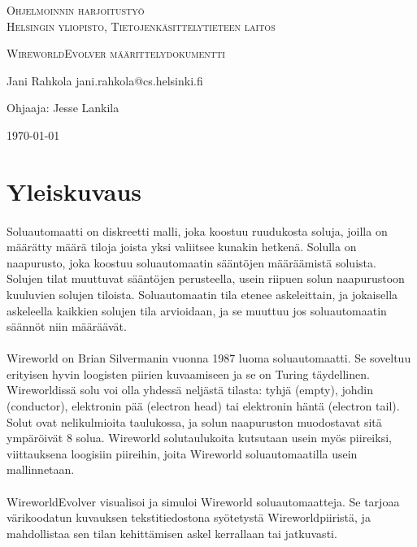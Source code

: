 \documentclass[a4paper,12pt]{article}
\begin{document}
\begin{titlepage}
\begin{center}
\textsc{\large Ohjelmoinnin harjoitustyö}\\[0.2cm] 
\textsc{\large Helsingin yliopisto, Tietojenkäsittelytieteen
laitos}\\[0.2cm]

\vspace{1cm}

\textsc{\LARGE WireworldEvolver määrittelydokumentti}

\vspace{2cm}

Jani Rahkola
jani.rahkola@cs.helsinki.fi

Ohjaaja: Jesse Lankila


\vfill
{\large \today}

\end{center}
\end{titlepage}

\section{Yleiskuvaus}
\paragraph{}
Soluautomaatti on diskreetti malli, joka koostuu ruudukosta soluja,
joilla on määrätty määrä tiloja joista yksi valiitsee kunakin hetkenä.
Solulla on naapurusto, joka koostuu soluautomaatin sääntöjen määräämistä
soluista. Solujen tilat muuttuvat sääntöjen perusteella, usein riipuen
solun naapurustoon kuuluvien solujen tiloista. Soluautomaatin tila
etenee askeleittain, ja jokaisella askeleella kaikkien solujen tila
arvioidaan, ja se muuttuu jos soluautomaatin säännöt niin määräävät.
\paragraph{}
Wireworld on Brian Silvermanin vuonna 1987 luoma soluautomaatti. Se
soveltuu erityisen hyvin loogisten piirien kuvaamiseen ja se on Turing
täydellinen. Wireworldissä solu voi olla yhdessä neljästä tilasta:
tyhjä (empty), johdin (conductor), elektronin pää (electron head) tai
elektronin häntä (electron tail). Solut ovat nelikulmioita taulukossa,
ja solun naapuruston muodostavat sitä ympäröivät 8 solua. Wireworld
solutaulukoita kutsutaan usein myös piireiksi, viittauksena loogisiin
piireihin, joita Wireworld soluautomaatilla usein mallinnetaan.
\paragraph{}
WireworldEvolver visualisoi ja simuloi Wireworld soluautomaatteja. Se
tarjoaa värikoodatun kuvauksen tekstitiedostona syötetystä
Wireworldpiiristä, ja mahdollistaa sen tilan kehittämisen askel kerrallaan tai
jatkuvasti.
\end{document}
